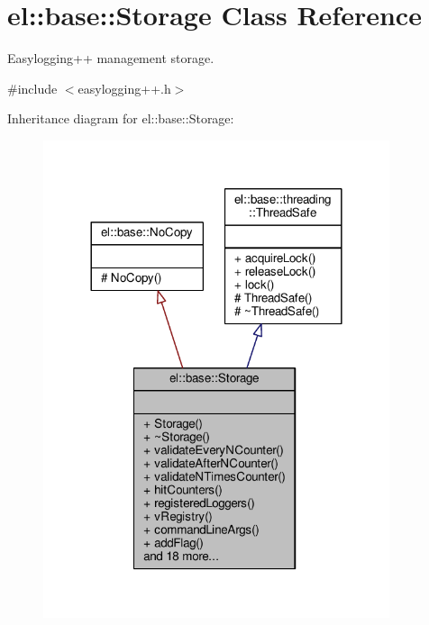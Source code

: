 \hypertarget{classel_1_1base_1_1Storage}{}\section{el\+:\+:base\+:\+:Storage Class Reference}
\label{classel_1_1base_1_1Storage}


Easylogging++ management storage.  




{\ttfamily \#include $<$easylogging++.\+h$>$}



Inheritance diagram for el\+:\+:base\+:\+:Storage\+:
\nopagebreak
\begin{figure}[H]
\begin{center}
\leavevmode
\includegraphics[width=288pt]{de/d37/classel_1_1base_1_1Storage__inherit__graph}
\end{center}
\end{figure}


